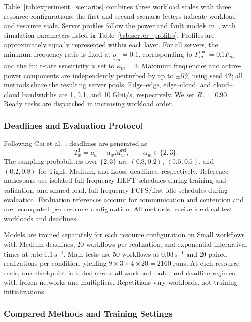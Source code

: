 \documentclass[journal]{IEEEtran}
\begin{document}
Table~\ref{tab:experiment_scenarios} combines three workload scales with three resource configurations; the first and second scenario letters indicate workload and resource scale. Server profiles follow the power and fault models
in~\cite{zhang2017,wu2018}, with simulation parameters listed in Table~\ref{tab:server_profiles}. Profiles are approximately equally represented within each layer. For all servers, the minimum frequency ratio is fixed at $\underline\rho_m=0.1$, corresponding to $F_m^{\min}=0.1F_m$, and the fault-rate
sensitivity is set to $\kappa_m=3$. Maximum frequencies and active-power components are independently perturbed by up to $\pm5\%$ using seed 42; all methods share the resulting server pools. Edge--edge, edge--cloud, and cloud--cloud bandwidths are 1, 0.1, and 10 Gbit/s, respectively. We set $R_w=0.90$. Ready tasks are dispatched in increasing workload order.


\subsubsection{Deadlines and Evaluation Protocol}

Following Cai et al.~\cite{cai2025}, deadlines are generated as
\[
    T_w^{\mathrm d}=a_w+\alpha_w M_w^{\mathrm{ref}},
    \qquad \alpha_w\in\{2,3\}.
\]
The sampling probabilities over $\{2,3\}$ are $(0.8,0.2)$,
$(0.5,0.5)$, and $(0.2,0.8)$ for Tight, Medium, and Loose
deadlines, respectively. Reference makespans use isolated
full-frequency HEFT schedules during training and validation,
and shared-load, full-frequency FCFS/first-idle schedules
during evaluation. Evaluation references account for
communication and contention and are recomputed per resource
configuration. All methods receive identical test workloads
and deadlines.

Models are trained separately for each resource configuration
on Small workflows with Medium deadlines, 20 workflows per
realization, and exponential interarrival times at rate
$0.1~\mathrm{s}^{-1}$. Main tests use 50 workflows at
$0.03~\mathrm{s}^{-1}$ and 20 paired realizations per condition,
yielding $9\times3\times4\times20=2160$ runs.
At each resource scale, one checkpoint is tested across all
workload scales and deadline regimes with frozen networks
and multipliers. Repetitions vary workloads, not training
initializations.


\subsubsection{Compared Methods and Training Settings}
\end{document}

